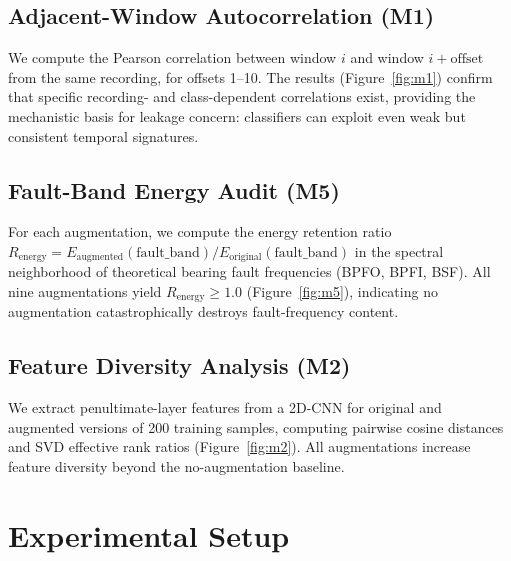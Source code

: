 ﻿\documentclass[11pt,a4paper]{article}
\begin{document}
\subsection{Adjacent-Window Autocorrelation (M1)}

We compute the Pearson correlation between window $i$ and window $i+\text{offset}$ from the same recording, for offsets 1--10. The results (Figure~\ref{fig:m1}) confirm that specific recording- and class-dependent correlations exist, providing the mechanistic basis for leakage concern: classifiers can exploit even weak but consistent temporal signatures.

\subsection{Fault-Band Energy Audit (M5)}

For each augmentation, we compute the energy retention ratio $R_{\text{energy}} = E_{\text{augmented}}(\text{fault\_band}) / E_{\text{original}}(\text{fault\_band})$ in the spectral neighborhood of theoretical bearing fault frequencies (BPFO, BPFI, BSF). All nine augmentations yield $R_{\text{energy}} \geq 1.0$ (Figure~\ref{fig:m5}), indicating no augmentation catastrophically destroys fault-frequency content.

\subsection{Feature Diversity Analysis (M2)}

We extract penultimate-layer features from a 2D-CNN for original and augmented versions of 200 training samples, computing pairwise cosine distances and SVD effective rank ratios (Figure~\ref{fig:m2}). All augmentations increase feature diversity beyond the no-augmentation baseline.

\section{Experimental Setup}
\end{document}

